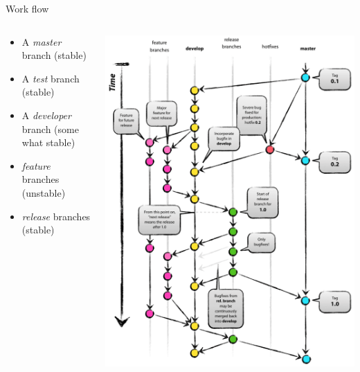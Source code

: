\documentclass[table,svgnames,aspectratio=169]{beamer}
\begin{document}
\begin{frame}[label={sec:orgf845d22}]{Work flow}
\begin{columns}
\begin{column}{.5\columnwidth}
\begin{itemize}
\item A \emph{master} branch (stable)
\item A \emph{test} branch (stable)
\item A \emph{developer} branch (some what stable)
\item \emph{feature} branches (unstable)
\item \emph{release} branches (stable)
\end{itemize}
\end{column}
\begin{column}{.5\columnwidth}
\begin{center}
\includegraphics[width=.75\textwidth]{graphics/git-model.png}
\end{center}
\end{column}
\end{columns}
\end{frame}
\end{document}
